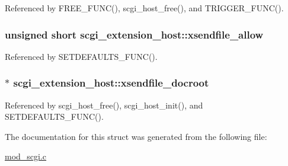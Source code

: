 Referenced by F\-R\-E\-E\-\_\-\-F\-U\-N\-C(), scgi\-\_\-host\-\_\-free(), and T\-R\-I\-G\-G\-E\-R\-\_\-\-F\-U\-N\-C().

\hypertarget{structscgi__extension__host_a2cb7607aadb32562b5818b445e7f5152}{
\subsubsection[{xsendfile\-\_\-allow}]{\setlength{\rightskip}{0pt plus 5cm}unsigned short scgi\-\_\-extension\-\_\-host\-::xsendfile\-\_\-allow}}\label{structscgi__extension__host_a2cb7607aadb32562b5818b445e7f5152}


Referenced by S\-E\-T\-D\-E\-F\-A\-U\-L\-T\-S\-\_\-\-F\-U\-N\-C().

\hypertarget{structscgi__extension__host_a449d1e86de245cbb411ff603193ea679}{
\subsubsection[{xsendfile\-\_\-docroot}]{$\ast$ scgi\-\_\-extension\-\_\-host\-::xsendfile\-\_\-docroot}}\label{structscgi__extension__host_a449d1e86de245cbb411ff603193ea679}


Referenced by scgi\-\_\-host\-\_\-free(), scgi\-\_\-host\-\_\-init(), and S\-E\-T\-D\-E\-F\-A\-U\-L\-T\-S\-\_\-\-F\-U\-N\-C().



The documentation for this struct was generated from the following file\-:\begin{DoxyCompactItemize}
\item 
\hyperlink{mod__scgi_8c}{mod\-\_\-scgi.\-c}\end{DoxyCompactItemize}
